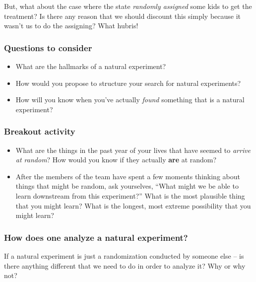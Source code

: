 \documentclass[
]{article}
\providecommand{\tightlist}{%
  \setlength{\itemsep}{0pt}\setlength{\parskip}{0pt}}
\begin{document}
But, what about the case where the state \emph{randomly assigned} some kids to get the treatment? Is there any reason that we should discount this simply because it wasn't us to do the assigning? What hubris!

\hypertarget{questions-to-consider}{%
\subsubsection{Questions to consider}\label{questions-to-consider}}

\begin{itemize}
\tightlist
\item
  What are the hallmarks of a natural experiment?
\item
  How would you propose to structure your search for natural experiments?
\item
  How will you know when you've actually \emph{found} something that is a natural experiment?
\end{itemize}

\hypertarget{breakout-activity}{%
\subsubsection{Breakout activity}\label{breakout-activity}}

\begin{itemize}
\tightlist
\item
  What are the things in the past year of your lives that have seemed to \emph{arrive at random}? How would you know if they actually \textbf{are} at random?
\item
  After the members of the team have spent a few moments thinking about things that might be random, ask yourselves, ``What might we be able to learn downstream from this experiment?'' What is the most plausible thing that you might learn? What is the longest, most extreme possibility that you might learn?
\end{itemize}

\hypertarget{how-does-one-analyze-a-natural-experiment}{%
\subsubsection{How does one analyze a natural experiment?}\label{how-does-one-analyze-a-natural-experiment}}

If a natural experiment is just a randomization conducted by someone else -- is there anything different that we need to do in order to analyze it? Why or why not?
\end{document}
